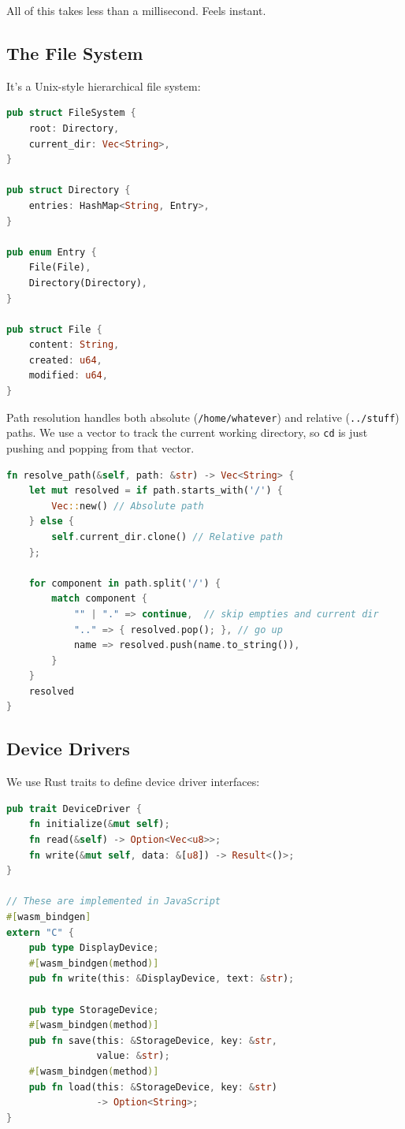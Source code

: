 \documentclass[conference]{IEEEtran}
\begin{document}
All of this takes less than a millisecond. Feels instant.

\subsection{The File System}

It's a Unix-style hierarchical file system:

\begin{lstlisting}[language=Rust, caption=File System Core Structure]
pub struct FileSystem {
    root: Directory,
    current_dir: Vec<String>,
}

pub struct Directory {
    entries: HashMap<String, Entry>,
}

pub enum Entry {
    File(File),
    Directory(Directory),
}

pub struct File {
    content: String,
    created: u64,
    modified: u64,
}
\end{lstlisting}

Path resolution handles both absolute (\texttt{/home/whatever}) and relative (\texttt{../stuff}) paths. We use a vector to track the current working directory, so \texttt{cd} is just pushing and popping from that vector.

\begin{lstlisting}[language=Rust, caption=Path Resolution]
fn resolve_path(&self, path: &str) -> Vec<String> {
    let mut resolved = if path.starts_with('/') {
        Vec::new() // Absolute path
    } else {
        self.current_dir.clone() // Relative path
    };
    
    for component in path.split('/') {
        match component {
            "" | "." => continue,  // skip empties and current dir
            ".." => { resolved.pop(); }, // go up
            name => resolved.push(name.to_string()),
        }
    }
    resolved
}
\end{lstlisting}

\subsection{Device Drivers}

We use Rust traits to define device driver interfaces:

\begin{lstlisting}[language=Rust, caption=Device Driver Traits]
pub trait DeviceDriver {
    fn initialize(&mut self);
    fn read(&self) -> Option<Vec<u8>>;
    fn write(&mut self, data: &[u8]) -> Result<()>;
}

// These are implemented in JavaScript
#[wasm_bindgen]
extern "C" {
    pub type DisplayDevice;
    #[wasm_bindgen(method)]
    pub fn write(this: &DisplayDevice, text: &str);
    
    pub type StorageDevice;
    #[wasm_bindgen(method)]
    pub fn save(this: &StorageDevice, key: &str, 
                value: &str);
    #[wasm_bindgen(method)]
    pub fn load(this: &StorageDevice, key: &str) 
                -> Option<String>;
}
\end{lstlisting}
\end{document}

